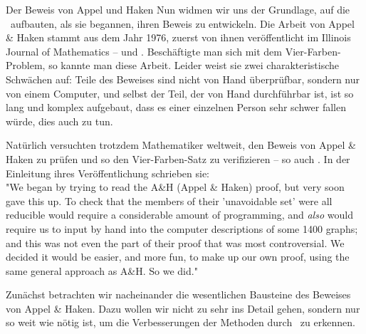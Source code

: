 \begin{chapter}{Der Beweis von Appel und Haken}
  Nun widmen wir uns der Grundlage, auf die \rsst\-\ aufbauten, als sie begannen, ihren Beweis zu entwickeln. Die Arbeit von Appel \& Haken stammt aus dem Jahr 1976, zuerst von ihnen veröffentlicht im Illinois Journal of Mathematics -- \cite{AH1} und \cite{AH2}. Beschäftigte man sich mit dem Vier-Farben-Problem, so kannte man diese Arbeit. Leider weist sie zwei charakteristische Schwächen auf: Teile des Beweises sind nicht von Hand überprüfbar, sondern nur von einem Computer, und selbst der Teil, der von Hand durchführbar ist, ist so lang und komplex aufgebaut, dass es einer einzelnen Person sehr schwer fallen würde, dies auch zu tun.
  
  Natürlich versuchten trotzdem Mathematiker weltweit, den Beweis von Appel \& Haken zu prüfen und so den Vier-Farben-Satz zu verifizieren -- so auch \rsst. In der Einleitung ihres Veröffentlichung schrieben sie:\\  
  "We began by trying to read the A\&H (Appel \& Haken) proof, but very soon gave this up. To check that the members of their 'unavoidable set' were all reducible would require a considerable amount of programming, and \textit{also} would require us to input by hand into the computer descriptions of some 1400 graphs; and this was not even the part of their proof that was most controversial. We decided it would be easier, and more fun, to make up our own proof, using the same general approach as A\&H. So we did."\cite[Einleitung]{FourRSST}
  
  Zunächst betrachten wir nacheinander die wesentlichen Bausteine des Beweises von Appel \& Haken. Dazu wollen wir nicht zu sehr ins Detail gehen, sondern nur so weit wie nötig ist, um die Verbesserungen der Methoden durch \rsst\-\ zu erkennen. 
  
  
  
 \end{chapter}